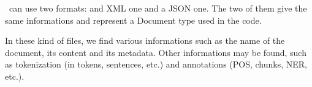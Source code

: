 \documentclass[manual-fr.tex]{subfiles}
\begin{document}
\SEM\ can use two formats: and XML one and a JSON one. The two of them give the same informations and represent a Document type used in the code.

In these kind of files, we find various informations such as the name of the document, its content and its metadata. Other informations may be found, such as tokenization (in tokens, sentences, etc.) and annotations (POS, chunks, NER, etc.).
\end{document}
